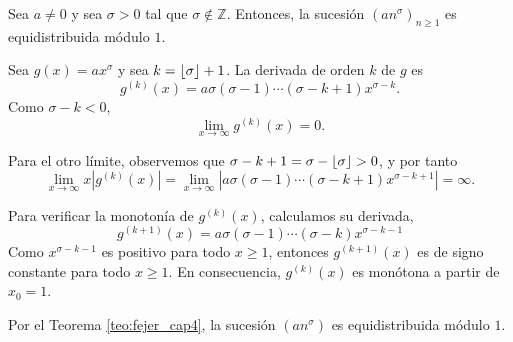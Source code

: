 \begin{example}
    Sea $a \neq 0$ y sea $\sigma > 0$ tal que $\sigma \notin \mathbb{Z}$.
    Entonces, la sucesión $(an^\sigma)_{n\geq1}$ es equidistribuida módulo $1$.
\end{example}

\begin{resolve}
    Sea $g(x) = a x^\sigma$ y sea $k = \lfloor \sigma \rfloor+1$. La derivada de orden $k$ de $g$ es 
    \[
        g^{(k)}(x) = a \sigma (\sigma - 1) \cdots (\sigma - k + 1) x^{\sigma - k}.
    \]
    Como $\sigma-k < 0$,
    \[
        \lim_{x \to \infty} g^{(k)}(x) = 0.
    \]

    Para el otro límite, observemos que $\sigma-k+1 = \sigma - \lfloor \sigma \rfloor > 0$, y por tanto
    \[
        \lim_{x \to \infty} x \left|g^{(k)}(x)\right| = 
        \lim_{x \to \infty} \left|a \sigma (\sigma - 1) \cdots (\sigma - k + 1)x^{\sigma-k+1} \right| = \infty.
    \]
    
    Para verificar la monotonía de $g^{(k)}(x)$, calculamos su derivada,
    \[
        g^{(k+1)}(x) = a \sigma (\sigma - 1) \cdots (\sigma - k) x^{\sigma - k - 1}
    \]
    Como $x^{\sigma-k-1}$ es positivo para todo $x\geq1$, entonces $g^{(k+1)}(x)$ 
    es de signo constante para todo $x \geq 1$. En consecuencia, $g^{(k)}(x)$ es 
    monótona a partir de $x_0 = 1$.
    
    Por el Teorema \ref{teo:fejer_cap4}, la sucesión $(an^\sigma)$ es equidistribuida módulo $1$.
\end{resolve}